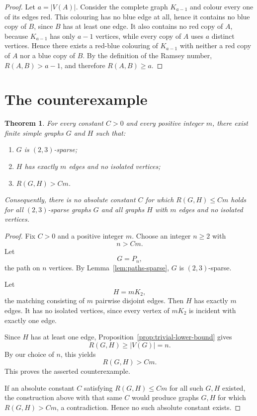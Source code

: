 \documentclass[11pt]{amsart}
\newtheorem{theorem}{Theorem}
\theoremstyle{remark}
\begin{document}
\begin{proof}
Let $a=|V(A)|$.  Consider the complete graph $K_{a-1}$ and colour every one of its edges red.  This colouring has no blue edge at all, hence it contains no blue copy of $B$, since $B$ has at least one edge.  It also contains no red copy of $A$, because $K_{a-1}$ has only $a-1$ vertices, while every copy of $A$ uses $a$ distinct vertices.  Hence there exists a red-blue colouring of $K_{a-1}$ with neither a red copy of $A$ nor a blue copy of $B$.  By the definition of the Ramsey number, $R(A,B)>a-1$, and therefore $R(A,B)\ge a$.
\end{proof}

\section{The counterexample}

\begin{theorem}\label{thm:main-counterexample}
For every constant $C>0$ and every positive integer $m$, there exist finite simple graphs $G$ and $H$ such that:
\begin{enumerate}[label=\textup{(\roman*)}]
    \item $G$ is $(2,3)$-sparse;
    \item $H$ has exactly $m$ edges and no isolated vertices;
    \item $R(G,H)>Cm$.
\end{enumerate}
Consequently, there is no absolute constant $C$ for which $R(G,H)\le Cm$ holds for all $(2,3)$-sparse graphs $G$ and all graphs $H$ with $m$ edges and no isolated vertices.
\end{theorem}

\begin{proof}
Fix $C>0$ and a positive integer $m$.  Choose an integer $n\ge 2$ with
\[
        n>Cm.
\]
Let
\[
        G=P_n,
\]
the path on $n$ vertices.  By Lemma~\ref{lem:paths-sparse}, $G$ is $(2,3)$-sparse.

Let
\[
        H=mK_2,
\]
the matching consisting of $m$ pairwise disjoint edges.  Then $H$ has exactly $m$ edges.  It has no isolated vertices, since every vertex of $mK_2$ is incident with exactly one edge.

Since $H$ has at least one edge, Proposition~\ref{prop:trivial-lower-bound} gives
\[
        R(G,H)\ge |V(G)|=n.
\]
By our choice of $n$, this yields
\[
        R(G,H)>Cm.
\]
This proves the asserted counterexample.

If an absolute constant $C$ satisfying $R(G,H)\le Cm$ for all such $G,H$ existed, the construction above with that same $C$ would produce graphs $G,H$ for which $R(G,H)>Cm$, a contradiction.  Hence no such absolute constant exists.
\end{proof}
\end{document}
